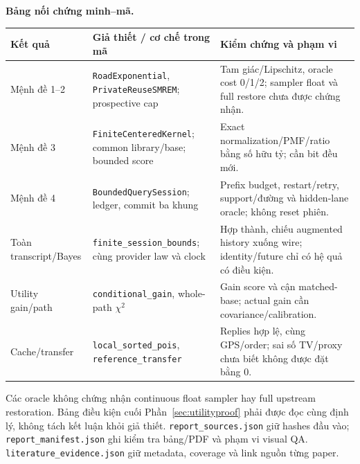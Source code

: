 \textbf{Bảng nối chứng minh--mã.}

\begin{footnotesize}
\begin{tabularx}{\linewidth}{@{}P{2.6cm}P{4cm}Y@{}}\toprule
\textbf{Kết quả} & \textbf{Giả thiết / cơ chế trong mã} & \textbf{Kiểm chứng và phạm vi}\\\midrule
Mệnh đề 1--2 & \texttt{RoadExponential}, \texttt{PrivateReuseSMREM}; prospective cap & Tam giác/Lipschitz, oracle cost 0/1/2; sampler float và full restore chưa được chứng nhận.\\
Mệnh đề 3 & \texttt{FiniteCenteredKernel}; common library/base; bounded score & Exact normalization/PMF/ratio bằng số hữu tỷ; cần bit đều mới.\\
Mệnh đề 4 & \texttt{BoundedQuerySession}; ledger, commit ba khung & Prefix budget, restart/retry, support/đường và hidden-lane oracle; không reset phiên.\\
Toàn transcript/Bayes & \texttt{finite\_session\_bounds}; cùng provider law và clock & Hợp thành, chiếu augmented history xuống wire; identity/future chỉ có hệ quả có điều kiện.\\
Utility gain/path & \texttt{conditional\_gain}, whole-path $\chi^2$ & Gain score và cận matched-base; actual gain cần covariance/calibration.\\
Cache/transfer & \texttt{local\_sorted\_pois}, \texttt{reference\_transfer} & Replies hợp lệ, cùng GPS/order; sai số TV/proxy chưa biết không được đặt bằng 0.\\\bottomrule
\end{tabularx}
\end{footnotesize}
Các oracle không chứng nhận continuous float sampler hay full upstream restoration. Bảng điều kiện cuối
Phần~\ref{sec:utilityproof} phải được đọc cùng định lý, không tách kết luận khỏi giả thiết.
\texttt{report\_sources.json} giữ hashes đầu vào; \texttt{report\_manifest.json} ghi kiểm tra bảng/PDF
và phạm vi visual QA. \texttt{literature\_evidence.json} giữ metadata, coverage và link nguồn từng paper.
